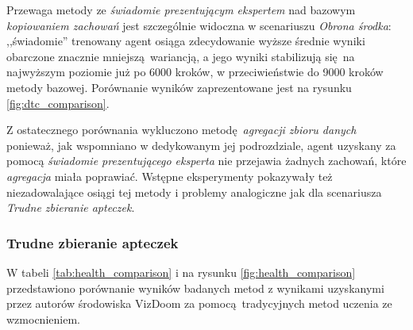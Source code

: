 \documentclass[polish,master,a4paper,oneside]{ppfcmthesis}
\begin{document}
Przewaga metody ze \textit{świadomie prezentującym ekspertem} nad bazowym \textit{kopiowaniem zachowań} jest szczególnie widoczna w scenariuszu \textit{Obrona środka}: ,,świadomie'' trenowany agent osiąga zdecydowanie wyższe średnie wyniki obarczone znacznie mniejszą wariancją, a jego wyniki stabilizują się na najwyższym poziomie już po 6000 kroków, w przeciwieństwie do 9000 kroków metody bazowej. Porównanie wyników zaprezentowane jest na rysunku \ref{fig:dtc_comparison}.

\begin{figure}[H]
\end{figure}

Z ostatecznego porównania wykluczono metodę \textit{agregacji zbioru danych} ponieważ, jak wspomniano w dedykowanym jej podrozdziale, agent uzyskany za pomocą \textit{świadomie prezentującego eksperta} nie przejawia żadnych zachowań, które \textit{agregacja} miała poprawiać. Wstępne eksperymenty pokazywały też niezadowalające osiągi tej metody i problemy analogiczne jak dla scenariusza \textit{Trudne zbieranie apteczek}.


\subsubsection{Trudne zbieranie apteczek}

W tabeli \ref{tab:health_comparison} i na rysunku \ref{fig:health_comparison} przedstawiono porównanie wyników badanych metod z wynikami uzyskanymi przez autorów środowiska VizDoom za pomocą tradycyjnych metod uczenia ze wzmocnieniem.
\end{document}
